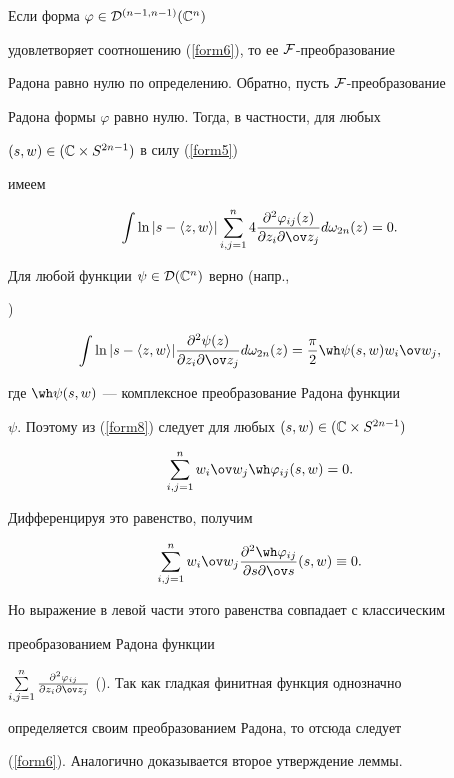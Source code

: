 \begin{pf}


Если форма $\varphi\in{\cal D}^{(n-1,n-1)}(\Bbb C^n)$


удовлетворяет соотношению (\ref{form6}), то ее $\cal F$-преобразование 


Радона равно нулю по определению. Обратно, пусть $\cal F$-преобразование 


Радона формы $\varphi$ равно нулю. Тогда, в частности, для любых 


$(s,w)\in(\Bbb C\times S^{2n-1})$ в силу (\ref{form5})


имеем 


\begin{equation}\label{form8}


\int\ln|s-\langle z, w\rangle|\sum


\limits_{i,j=1}^n4\frac{\partial^2\varphi_{ij}(z)}{\partial z_i\partial 


\ov z_j}


d\omega_{2n}(z)=0.


\end{equation}


Для любой функции $\psi\in{\cal D}(\Bbb C^n)$ верно (напр., 


\cite{Seker7}) 


$$


\int\ln|s-\langle z, w\rangle|\frac{\partial^2\psi(z)}{\partial 


z_i\partial \ov z_j}


d\omega_{2n}(z)=\frac{\pi}{2}\wh\psi(s,w)w_i\ov w_j,


$$


где $\wh\psi(s,w)$ --- комплексное преобразование Радона функции


$\psi$. Поэтому из (\ref{form8}) следует для любых $(s,w)\in(\Bbb C\times 


S^{2n-1})$


$$\sum\limits_{i,j=1}^nw_i\ov w_j\wh\varphi_{ij}(s,w)=0.$$


Дифференцируя это равенство, получим


$$


\sum\limits_{i,j=1}^nw_i\ov w_j


\frac{\partial^2\wh\varphi_{ij}}{\partial s\partial\ov s}(s,w)\equiv 0.


$$


Но выражение в левой части этого равенства совпадает с классическим 


преобразованием Радона функции 


$\sum\limits_{i,j=1}^n\frac{\partial^2\varphi_{ij}}{\partial z_i\partial 


\ov z_j}$ (\cite{Gelf}). Так как гладкая финитная функция однозначно 


определяется своим преобразованием Радона, то отсюда следует


(\ref{form6}). Аналогично доказывается второе утверждение леммы. 


\end{pf}





